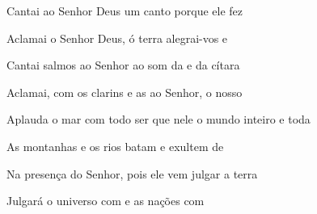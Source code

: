 \begin{greenumerate}
  \item {}Cantai ao Senhor Deus um canto  porque ele fez 

  \item {}Aclamai o Senhor Deus, ó terra  alegrai-vos e 

  \item {}Cantai salmos ao Senhor ao som da  e da cítara 

  \item {}Aclamai, com os clarins e as  ao Senhor, o nosso 

  \item {}Aplauda o mar com todo ser que nele  o mundo inteiro e toda 

  \item {}As montanhas e os rios batam  e exultem de 

  \item {}Na presença do Senhor, pois ele  vem julgar a terra 

  \item {}Julgará o universo com  e as nações com 
\end{greenumerate}